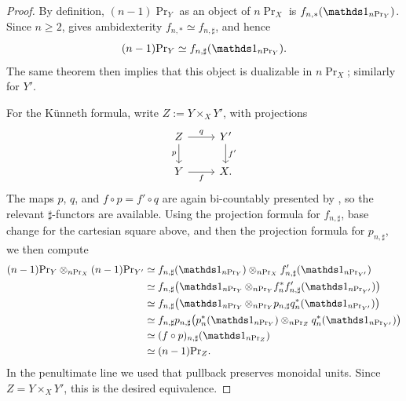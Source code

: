 \documentclass[11pt]{book}
\begin{document}
	\begin{proof}
		By definition, $(n-1)\Pr_Y$ as an object of $n\Pr_X$ is $f_{n,*}(\unit_{n\Pr_Y})$. Since $n \geq 2$,  gives ambidexterity $f_{n,*} \simeq f_{n,\sharp}$, and hence
		\[
			(n-1)\Pr_Y \simeq f_{n,\sharp}(\unit_{n\Pr_Y}).
		\]
		The same theorem then implies that this object is dualizable in $n\Pr_X$; similarly for $Y'$.

		For the Künneth formula, write $Z := Y \times_X Y'$, with projections
		\[
			\begin{tikzcd}
				Z \rar["q"] \dar["p"'] & Y' \dar["f'"] \\
				Y \rar["f"'] & X .
			\end{tikzcd}
		\]
		The maps $p$, $q$, and $f \circ p = f' \circ q$ are again bi-countably presented by , so the relevant $\sharp$-functors are available. Using the projection formula for $f_{n,\sharp}$, base change for the cartesian square above, and then the projection formula for $p_{n,\sharp}$, we then compute
		\[
		\begin{aligned}
			(n-1)\Pr_Y \otimes_{n\Pr_X} (n-1)\Pr_{Y'}
			&\simeq
			f_{n,\sharp}(\unit_{n\Pr_Y}) \otimes_{n\Pr_X} f'_{n,\sharp}(\unit_{n\Pr_{Y'}}) \\
			&\simeq
			f_{n,\sharp}\bigl(\unit_{n\Pr_Y} \otimes_{n\Pr_Y} f_n^* f'_{n,\sharp}(\unit_{n\Pr_{Y'}})\bigr) \\
			&\simeq
			f_{n,\sharp}\bigl(\unit_{n\Pr_Y} \otimes_{n\Pr_Y} p_{n,\sharp} q_n^*(\unit_{n\Pr_{Y'}})\bigr) \\
			&\simeq
			f_{n,\sharp} p_{n,\sharp}\bigl(p_n^*(\unit_{n\Pr_Y}) \otimes_{n\Pr_Z} q_n^*(\unit_{n\Pr_{Y'}})\bigr) \\
			&\simeq
			(f \circ p)_{n,\sharp}(\unit_{n\Pr_Z}) \\
			&\simeq
			(n-1)\Pr_Z.
		\end{aligned}
		\]
		In the penultimate line we used that pullback preserves monoidal units. Since $Z = Y \times_X Y'$, this is the desired equivalence.
	\end{proof}
\end{document}

